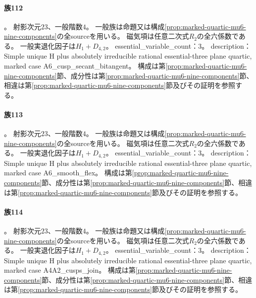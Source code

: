 \paragraph{族112}\label{catalogue:R4_MARKED_QUARTIC_MU6_A6_CUSP_SECANT_BITANGENT_23}
。
射影次元$23$、一般階数$4$。
一般族は命題又は構成\ref{prop:marked-quartic-mu6-nine-components}の全sourceを用いる。
磁気項は任意二次式$R_2$の全六係数である。
一般実退化因子は$H_{1}+D_{4,2}$。
essential\_variable\_count：3。
description：Simple unique H plus absolutely irreducible rational essential-three plane quartic, marked case A6\_cusp\_secant\_bitangent。
構成は第\ref{prop:marked-quartic-mu6-nine-components}節、成分性は第\ref{prop:marked-quartic-mu6-nine-components}節、相違は第\ref{prop:marked-quartic-mu6-nine-components}節及びその証明を参照する。

\paragraph{族113}\label{catalogue:R4_MARKED_QUARTIC_MU6_A6_SMOOTH_FLEX_23}
。
射影次元$23$、一般階数$4$。
一般族は命題又は構成\ref{prop:marked-quartic-mu6-nine-components}の全sourceを用いる。
磁気項は任意二次式$R_2$の全六係数である。
一般実退化因子は$H_{1}+D_{4,2}$。
essential\_variable\_count：3。
description：Simple unique H plus absolutely irreducible rational essential-three plane quartic, marked case A6\_smooth\_flex。
構成は第\ref{prop:marked-quartic-mu6-nine-components}節、成分性は第\ref{prop:marked-quartic-mu6-nine-components}節、相違は第\ref{prop:marked-quartic-mu6-nine-components}節及びその証明を参照する。

\paragraph{族114}\label{catalogue:R4_MARKED_QUARTIC_MU6_A4A2_CUSPS_JOIN_23}
。
射影次元$23$、一般階数$4$。
一般族は命題又は構成\ref{prop:marked-quartic-mu6-nine-components}の全sourceを用いる。
磁気項は任意二次式$R_2$の全六係数である。
一般実退化因子は$H_{1}+D_{4,2}$。
essential\_variable\_count：3。
description：Simple unique H plus absolutely irreducible rational essential-three plane quartic, marked case A4A2\_cusps\_join。
構成は第\ref{prop:marked-quartic-mu6-nine-components}節、成分性は第\ref{prop:marked-quartic-mu6-nine-components}節、相違は第\ref{prop:marked-quartic-mu6-nine-components}節及びその証明を参照する。

